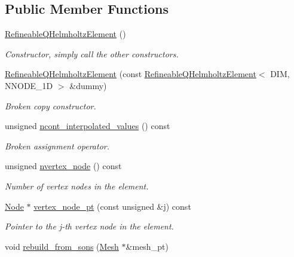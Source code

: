 \subsection*{Public Member Functions}
\begin{DoxyCompactItemize}
\item 
\hyperlink{classoomph_1_1RefineableQHelmholtzElement_a12ca9c1fed325bcb2428fe0898a58212}{Refineable\+Q\+Helmholtz\+Element} ()
\begin{DoxyCompactList}\small\item\em Constructor, simply call the other constructors. \end{DoxyCompactList}\item 
\hyperlink{classoomph_1_1RefineableQHelmholtzElement_a95a25f8d79eddcdb032d4c53683a8464}{Refineable\+Q\+Helmholtz\+Element} (const \hyperlink{classoomph_1_1RefineableQHelmholtzElement}{Refineable\+Q\+Helmholtz\+Element}$<$ D\+IM, N\+N\+O\+D\+E\+\_\+1D $>$ \&dummy)
\begin{DoxyCompactList}\small\item\em Broken copy constructor. \end{DoxyCompactList}\item 
unsigned \hyperlink{classoomph_1_1RefineableQHelmholtzElement_a0add7ad1814138f651fad0975ce8018d}{ncont\+\_\+interpolated\+\_\+values} () const
\begin{DoxyCompactList}\small\item\em Broken assignment operator. \end{DoxyCompactList}\item 
unsigned \hyperlink{classoomph_1_1RefineableQHelmholtzElement_aef66f141dff057f7ceb589d5e1142292}{nvertex\+\_\+node} () const
\begin{DoxyCompactList}\small\item\em Number of vertex nodes in the element. \end{DoxyCompactList}\item 
\hyperlink{classoomph_1_1Node}{Node} $\ast$ \hyperlink{classoomph_1_1RefineableQHelmholtzElement_a516240c69abf031a5d1c791043bd1d8b}{vertex\+\_\+node\+\_\+pt} (const unsigned \&j) const
\begin{DoxyCompactList}\small\item\em Pointer to the j-\/th vertex node in the element. \end{DoxyCompactList}\item 
void \hyperlink{classoomph_1_1RefineableQHelmholtzElement_a962ab14f0f212d41772775fb8bb73c1a}{rebuild\+\_\+from\+\_\+sons} (\hyperlink{classoomph_1_1Mesh}{Mesh} $\ast$\&mesh\+\_\+pt)

\end{DoxyCompactItemize}

